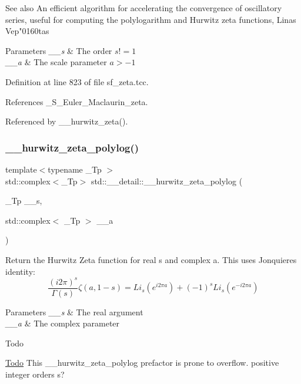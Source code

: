 \begin{DoxySeeAlso}{See also}
An efficient algorithm for accelerating the convergence of oscillatory series, useful for computing the polylogarithm and Hurwitz zeta functions, Linas Vep"0160tas
\end{DoxySeeAlso}

\begin{DoxyParams}{Parameters}
{\em \+\_\+\+\_\+s} & The order $ s != 1 $ \\
\hline
{\em \+\_\+\+\_\+a} & The scale parameter $ a > -1 $ \\
\hline
\end{DoxyParams}


Definition at line 823 of file sf\+\_\+zeta.\+tcc.



References \+\_\+\+S\+\_\+\+Euler\+\_\+\+Maclaurin\+\_\+zeta.



Referenced by \+\_\+\+\_\+hurwitz\+\_\+zeta().

\mbox{\label{namespacestd_1_1____detail_a7c45415c3ec0e137eea2364a6dd3af4e}} 
\subsubsection{\texorpdfstring{\+\_\+\+\_\+hurwitz\+\_\+zeta\+\_\+polylog()}{\_\_hurwitz\_zeta\_polylog()}}
{\footnotesize\ttfamily template$<$typename \+\_\+\+Tp $>$ \\
std\+::complex$<$\+\_\+\+Tp$>$ std\+::\+\_\+\+\_\+detail\+::\+\_\+\+\_\+hurwitz\+\_\+zeta\+\_\+polylog (\begin{DoxyParamCaption}\item[{\+\_\+\+Tp}]{\+\_\+\+\_\+s,  }\item[{std\+::complex$<$ \+\_\+\+Tp $>$}]{\+\_\+\+\_\+a }\end{DoxyParamCaption})}

Return the Hurwitz Zeta function for real s and complex a. This uses Jonquiere\textquotesingle{}s identity\+: \[ \frac{(i2\pi)^s}{\Gamma(s)}\zeta(a,1-s) = Li_s(e^{i2\pi a}) + (-1)^s Li_s(e^{-i2\pi a}) \] 
\begin{DoxyParams}{Parameters}
{\em \+\_\+\+\_\+s} & The real argument \\
\hline
{\em \+\_\+\+\_\+a} & The complex parameter \\
\hline
\end{DoxyParams}
\begin{DoxyRefDesc}{Todo}
\item[\hyperlink{todo__todo000010}{Todo}]This \+\_\+\+\_\+hurwitz\+\_\+zeta\+\_\+polylog prefactor is prone to overflow. positive integer orders s? \end{DoxyRefDesc}


